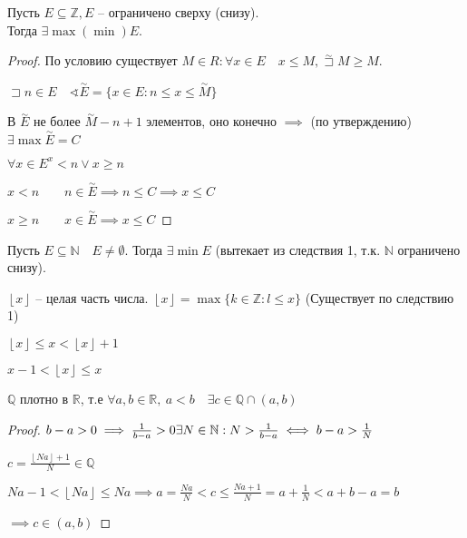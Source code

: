 \documentclass{book}
\newcommand\N{\ensuremath{\mathbb{N}}}
\newcommand\R{\ensuremath{\mathbb{R}}}
\newcommand\Z{\ensuremath{\mathbb{Z}}}
\renewcommand\O{\ensuremath{\emptyset}}
\newcommand\Q{\ensuremath{\mathbb{Q}}}
\theoremstyle{definition}
\begin{document}
    \begin{corollary}
        Пусть $E \subseteq \Z , E $ -- ограничено сверху (снизу).\\
        Тогда $\exists \max(\min) E$.
    \end{corollary}
    \begin{proof}
        По условию существует $M\in R: \forall x\in E\quad x\leqslant M, \overset{\sim }\sqsupset M \geqslant M$.
        
        $\sqsupset n\in E\quad \sphericalangle \overset{\sim }E = \{x\in E: n\leqslant x\leqslant \overset{\sim }M\}$

        В $\overset{\sim }E$ не более $\overset{\sim }M - n+1$ элементов, оно конечно $\implies $ (по утверждению) $\exists \max \overset{\sim }E = C$

        $\forall x\in E^ x<n\vee x\geqslant n\qquad$

        $x<n\qquad n\in \overset{\sim }E \implies n\leqslant C \implies x\leqslant C$

        $x\geqslant n\qquad x\in \overset{\sim }E \implies x\leqslant C$
    \end{proof}
    \begin{corollary}
        Пусть $E\subseteq \N \quad E\neq \O$. 
        Тогда $\exists \min E$ (вытекает из следствия 1, т.к. $\N $ ограничено снизу).
    \end{corollary}

    $\left\lfloor x \right\rfloor$ -- целая часть числа. $\left\lfloor x \right\rfloor = \max\{k\in \Z :l\leqslant x\}$ (Существует по следствию 1)

    $\left\lfloor x \right\rfloor\leqslant x< \left\lfloor x \right\rfloor +1    $

    $x-1< \left\lfloor x \right\rfloor \leqslant x$

    \begin{statement}
        $\Q$ плотно в $\R$, т.е $\forall a, b\in \R,\ a<b\quad \exists c\in \Q\cap (a,b)$
    \end{statement}
    \begin{proof}
        $b-a>0 \implies \frac{1}{b-a}>0\quad\newline \exists N\in \N: N>\frac{1}{b-a} \iff  b-a>\frac{1}{N}$
        
        $c = \frac{\left\lfloor Na \right\rfloor+1}{N} \in \Q$

        $Na-1<\left\lfloor Na \right\rfloor\leqslant Na \implies  a = \frac{Na}{N}<c\leqslant \frac{Na+1}{N} = a + \frac{1}{N}<a+b-a = b$

        $\implies c\in (a,b)$


    \end{proof}
\end{document}
